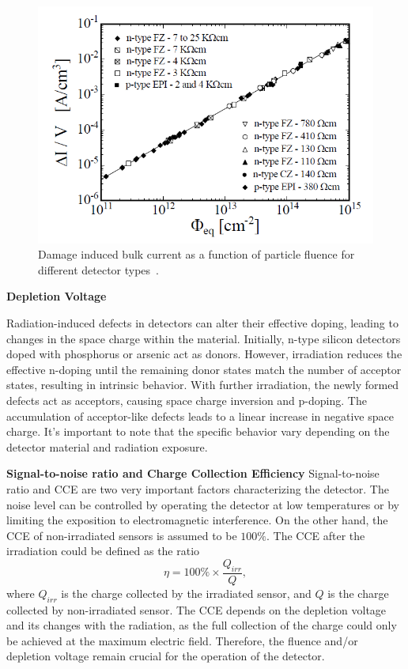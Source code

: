 \begin{figure}[!h]
\centering
\includegraphics[width=0.75\columnwidth]{Chapter2/images/lekage_current_fluence.png}
\caption{Damage induced bulk current as a function of particle fluence
for different detector types~\cite{Moll:1999kv}.}
\label{fig_leakage_theory}
\end{figure}
\textbf{Depletion Voltage}\bigbreak

Radiation-induced defects in detectors can alter their effective doping, leading to changes in the space charge within the material. Initially, n-type silicon detectors doped with phosphorus or arsenic act as donors. However, irradiation reduces the effective n-doping until the remaining donor states match the number of acceptor states, resulting in intrinsic behavior. With further irradiation, the newly formed defects act as acceptors, causing space charge inversion and p-doping. The accumulation of acceptor-like defects leads to a linear increase in negative space charge. It's important to note that the specific behavior vary depending on the detector material and radiation exposure. 

\textbf{Signal-to-noise ratio and Charge Collection Efficiency }\bigbreak
Signal-to-noise ratio and CCE are two very important factors characterizing the detector. The noise level can be controlled by operating the detector at low temperatures or by limiting the exposition to electromagnetic interference. On the other hand, the CCE of non-irradiated sensors is assumed to be $100\%$. The CCE after the irradiation could be defined as the ratio
\begin{equation}
    \eta = 100\%\times\frac{Q_{irr}}{Q},
\end{equation}
where $Q_{irr}$ is the charge collected by the irradiated sensor, and $Q$ is the charge collected by non-irradiated sensor. 
The CCE depends on the depletion voltage and its changes with the radiation, as the full collection of the charge could only be achieved at the maximum electric field. Therefore, the fluence and/or depletion voltage remain crucial for the operation of the detector. 

